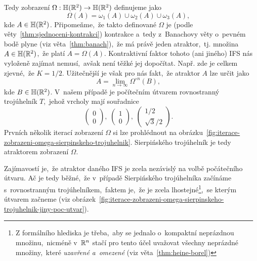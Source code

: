 Tedy zobrazení $\Omega:\mathbb{H}(\mathbb{R}^2) \rightarrow \mathbb{H}(\mathbb{R}^2)$ definujeme jako
\[\Omega(A)=\omega_1(A)\cup\omega_2(A)\cup\omega_3(A),\]
kde $A\in\mathbb{H}(\mathbb{R}^2)$. Připomeňme,~že takto definované $\Omega$ je (podle věty~\ref{thm:sjednoceni-kontrakci}) kontrakce a~tedy z~Banachovy věty o~pevném bodě plyne (viz věta~\ref{thm:banach}),~že má právě jeden atraktor,~tj. množina $A\in\mathbb{H}(\mathbb{R}^2)$,~že platí $A=\Omega(A)$. Kontraktivní faktor tohoto (ani jiného) IFS nás vyloženě zajímat nemusí,~avšak není těžké jej dopočítat. Např. zde je celkem zjevné,~že $K=1/2$. Užitečnější je však pro nás fakt,~že atraktor $A$ lze určit jako
\[A=\lim_{n\to\infty}\Omega^{\circ n}(B),\]
kde $B\in\mathbb{H}(\mathbb{R}^2)$. V~našem případě je počítečním útvarem rovnostranný trojúhelník $T$,~jehož vrcholy mají souřadnice
\[\left(\begin{matrix}
    0\\
    0
\end{matrix}\right),\;\left(\begin{matrix}
    1\\
    0
\end{matrix}\right),\;\left(\begin{matrix}
    1/2\\
    \sqrt{3}/2
\end{matrix}\right).\]
Prvních několik iterací zobrazení $\Omega$ si lze prohlédnout na obrázku~\ref{fig:iterace-zobrazeni-omega-sierpinskeho-trojuhelnik}. Sierpińského trojúhelník je tedy atraktorem zobrazení $\Omega$.

Zajímavostí je,~že atraktor daného IFS je zcela nezávislý na volbě počátečního útvaru. Ač je tedy běžné,~že v~případě Sierpińského trojúhelníka začínáme s~rovnostranným trojúhelníkem,~faktem je,~že je zcela lhostejné\footnote{Z formálního hlediska je třeba,~aby se jednalo o~kompaktní neprázdnou množinu,~nicméně v~$\mathbb{R}^n$ stačí pro tento účel uvažovat všechny neprázdné množiny,~které \emph{uzavřené a~omezené} (viz věta~\ref{thm:heine-borel})},~se kterým útvarem začneme (viz obrázek~\ref{fig:iterace-zobrazeni-omega-sierpinskeho-trojuhelnik-jiny-poc-utvar}).

